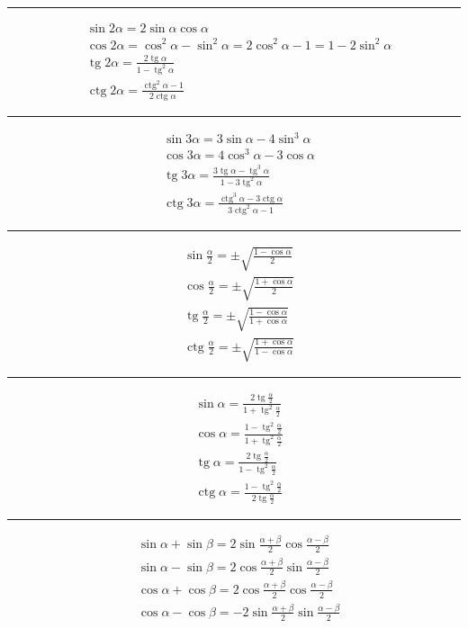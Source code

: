 \documentclass[12pt,a4paper,fleqn]{article}
\DeclareMathOperator{\tg}{tg}
\DeclareMathOperator{\ctg}{ctg}
\begin{document}
	\noindent\rule{10cm}{0.4pt}
	\begin{align*}
		&\sin2\alpha = 2\sin\alpha\cos\alpha\\
		&\cos2\alpha = \cos^2\alpha-\sin^2\alpha = 2\cos^2\alpha - 1 = 1-2\sin^2\alpha\\
		&\tg2\alpha = \frac{2\tg \alpha}{1 - \tg^2 \alpha}\\
		&\ctg2\alpha = \frac{\ctg^2\alpha-1}{2\ctg\alpha}
	\end{align*}
		
	\noindent\rule{10cm}{0.4pt}
	\begin{align*}
		&\sin3\alpha = 3\sin\alpha -4\sin^3\alpha\\
		&\cos3\alpha = 4\cos^3\alpha -3\cos\alpha\\
		&\tg3\alpha = \frac{3\tg\alpha-\tg^3\alpha}{1-3\tg^2\alpha}\\
		&\ctg3\alpha = \frac{\ctg^3\alpha - 3\ctg\alpha}{3\ctg^2\alpha-1}
	\end{align*}
	
	\noindent\rule{10cm}{0.4pt}
	\begin{align*}
		&\sin\frac{\alpha}{2} = \pm \sqrt{\frac{1-\cos\alpha}{2}}\\
		&\cos\frac{\alpha}{2} = \pm \sqrt{\frac{1+\cos\alpha}{2}}\\
		&\tg\frac{\alpha}{2} = \pm \sqrt{\frac{1-\cos\alpha}{1+\cos\alpha}}\\
		&\ctg\frac{\alpha}{2} = \pm \sqrt{\frac{1+\cos\alpha}{1-\cos\alpha}}
	\end{align*}
	
	\noindent\rule{10cm}{0.4pt}
	\begin{align*}
	&\sin\alpha = \frac{2\tg\frac{\alpha}{2}}{1+\tg^2\frac{\alpha}{2}}\\
	&\cos\alpha = \frac{1-\tg^2\frac{\alpha}{2}}{1+\tg^2\frac{\alpha}{2}}\\
	&\tg\alpha = \frac{2\tg\frac{\alpha}{2}}{1-\tg^2\frac{\alpha}{2}}\\
	&\ctg\alpha = \frac{1-\tg^2\frac{\alpha}{2}}{2\tg\frac{\alpha}{2}}
	\end{align*}
	
	\noindent\rule{10cm}{0.4pt}
	\begin{align*}
	&\sin\alpha + \sin \beta =2\sin\frac{\alpha+\beta}{2}\cos\frac{\alpha-\beta}{2} \\
	&\sin\alpha - \sin \beta =2\cos\frac{\alpha+\beta}{2}\sin\frac{\alpha-\beta}{2} \\
	&\cos\alpha + \cos \beta =2\cos\frac{\alpha+\beta}{2}\cos\frac{\alpha-\beta}{2} \\
	&\cos\alpha - \cos \beta =-2\sin\frac{\alpha+\beta}{2}\sin\frac{\alpha-\beta}{2} 
	\end{align*}
	
\end{document}
